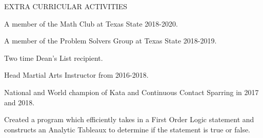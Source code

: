 \documentclass{resume} %
\begin{document}
% 
% 
% 
% 

\begin{rSection}{EXTRA CURRICULAR ACTIVITIES}

\begin{rSubsection}{}{} {} {} 
\item A member of the Math Club at Texas State 2018-2020.
\item A member of the Problem Solvers Group at Texas State 2018-2019.
\item Two time Dean's List recipient.
\item Head Martial Arts Instructor from 2016-2018.
\item National and World champion of Kata and Continuous Contact Sparring in 2017 and 2018.
\item Created a program which efficiently takes in a First Order Logic statement and constructs an Analytic Tableaux to determine if the statement is true or false.
\end{rSubsection}

\end{rSection}
\end{document}
